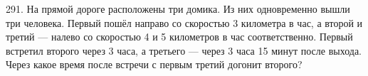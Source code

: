 291. На прямой дороге расположены три домика. Из них одновременно вышли три человека. Первый пошёл направо со скоростью 3 километра в час, а второй и третий --- налево со скоростью 4 и 5 километров в час соответственно. Первый встретил второго через 3 часа, а третьего --- через 3 часа 15 минут после выхода. Через какое время после встречи с первым третий догонит второго?\\

